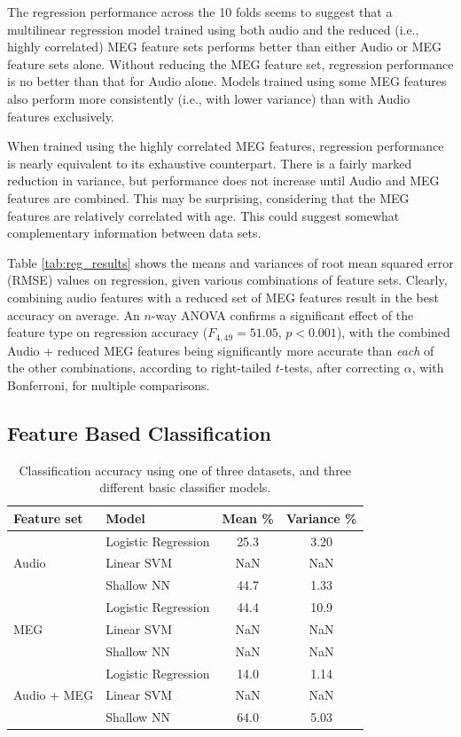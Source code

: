 \documentclass[utf8]{frontiersSCNS} %
\begin{document}
The regression performance across the 10 folds seems to suggest that a multilinear regression model trained using both audio and the reduced (i.e., highly correlated) MEG feature sets performs better than either Audio or MEG feature sets alone. Without  reducing the MEG feature set, regression performance is no better than that for Audio alone. Models trained using some MEG features also  perform more consistently (i.e., with lower variance) than with Audio features exclusively.

When trained using the highly correlated MEG features, regression performance is nearly equivalent to its exhaustive counterpart. There is a fairly marked reduction in variance, but performance does not increase until Audio and MEG features are combined. This may be surprising, considering that the MEG features are relatively correlated with age. This could suggest somewhat complementary information between data sets. %

Table \ref{tab:reg_results} shows the means and variances of root mean squared error (RMSE) values on regression, given various combinations of feature sets. Clearly, combining audio features with a reduced set of MEG features result in the best accuracy on average. An $n$-way ANOVA confirms a significant effect of the feature type on regression accuracy ($F_{4,49} = 51.05$, $p<0.001$), with the combined Audio + reduced MEG features being significantly more accurate than {\em each} of the other combinations, according to right-tailed $t$-tests, after correcting $\alpha$, with Bonferroni, for multiple comparisons.

\subsection{Feature Based Classification}

\begin{table}[t]
  \centering
  \label{tab:feat_results}
  \begin{tabular}{l l | c | c}
    \textbf{Feature set} & Model & \textbf{Mean \%} & \textbf{Variance \%} \\
    \toprule
    \multirow{3}{*}{Audio}
    & Logistic Regression & 25.3 & 3.20  \\
    & Linear SVM          & NaN & NaN  \\
    & Shallow NN          & 44.7 & 1.33  \\
    \midrule
    \multirow{3}{*}{MEG}
    & Logistic Regression & 44.4 & 10.9  \\
    & Linear SVM          & NaN & NaN  \\
    & Shallow NN          & NaN & NaN  \\
    \midrule
    \multirow{3}{*}{Audio + MEG}
    & Logistic Regression & 14.0 & 1.14  \\
    & Linear SVM          & NaN & NaN  \\
    & Shallow NN          & 64.0 & 5.03  \\
    \bottomrule
  \end{tabular}
  \caption{Classification accuracy using one of three datasets, and three different basic classifier models.}
\end{table}
\end{document}
